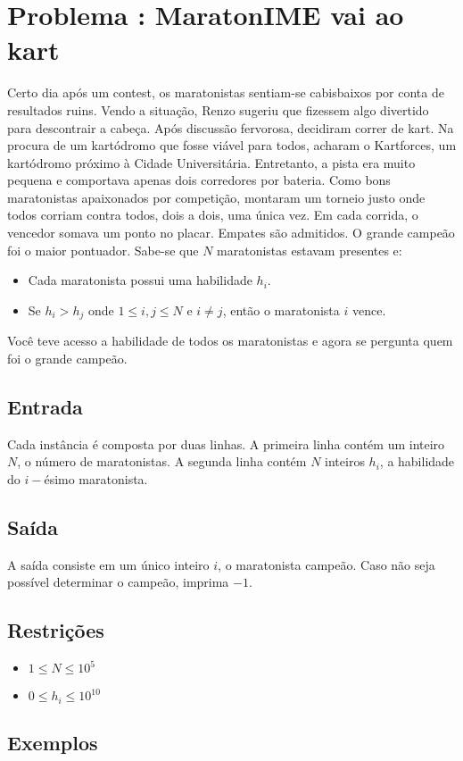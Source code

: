 \section*{Problema \proxLetra: MaratonIME vai ao kart}

Certo dia após um contest, os maratonistas sentiam-se cabisbaixos por conta de resultados ruins. Vendo a situação, Renzo sugeriu que fizessem algo divertido para descontrair a cabeça. Após discussão fervorosa, decidiram correr de kart. Na procura de um kartódromo que fosse viável para todos, acharam o Kartforces, um kartódromo próximo à Cidade Universitária. Entretanto, a pista era muito pequena e comportava apenas dois corredores por bateria. Como bons maratonistas apaixonados por competição, montaram um torneio justo onde todos corriam contra todos, dois a dois, uma única vez. Em cada corrida, o vencedor somava um ponto no placar. Empates são admitidos. O grande campeão foi o maior pontuador. Sabe-se que $N$ maratonistas estavam presentes e:

\begin{itemize}
	\item Cada maratonista possui uma habilidade $h_i$.
	\item Se $h_i > h_j$ onde $1 \leq i,j \leq N$ e $i \neq j$, então o maratonista $i$ vence.
\end{itemize}

Você teve acesso a habilidade de todos os maratonistas e agora se pergunta quem foi o grande campeão.

\subsection*{Entrada}
\textoDiversasInstanciasEOF

Cada instância é composta por duas linhas. 
A primeira linha contém um inteiro $N$, o número de maratonistas.
A segunda linha contém $N$ inteiros $h_i$, a habilidade do $i-$ésimo maratonista. 


\subsection*{Saída}

A saída consiste em um único inteiro $i$, o maratonista campeão. Caso não seja possível determinar o campeão, imprima $-1$.


\subsection*{Restrições}
\begin{itemize}
  \item $1 \leq N \leq 10^5$
  \item $0 \leq h_i \leq 10^{10}$
\end{itemize}

\subsection*{Exemplos}

